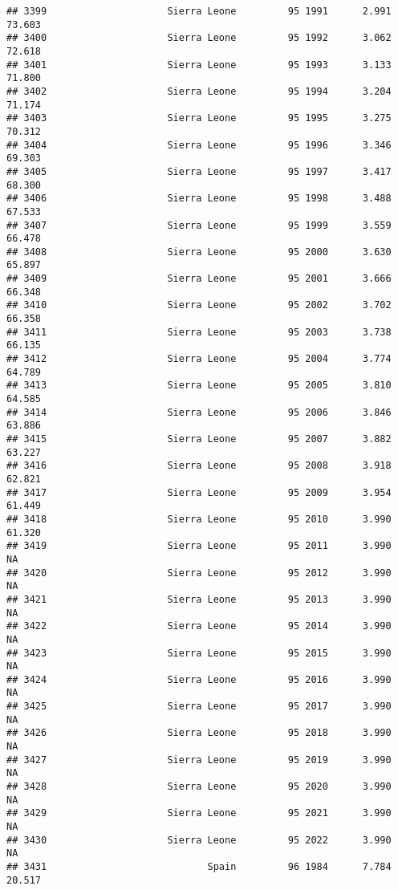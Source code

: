 \documentclass[
]{article}
\begin{document}
\begin{verbatim}
## 3399                     Sierra Leone         95 1991      2.991     73.603
## 3400                     Sierra Leone         95 1992      3.062     72.618
## 3401                     Sierra Leone         95 1993      3.133     71.800
## 3402                     Sierra Leone         95 1994      3.204     71.174
## 3403                     Sierra Leone         95 1995      3.275     70.312
## 3404                     Sierra Leone         95 1996      3.346     69.303
## 3405                     Sierra Leone         95 1997      3.417     68.300
## 3406                     Sierra Leone         95 1998      3.488     67.533
## 3407                     Sierra Leone         95 1999      3.559     66.478
## 3408                     Sierra Leone         95 2000      3.630     65.897
## 3409                     Sierra Leone         95 2001      3.666     66.348
## 3410                     Sierra Leone         95 2002      3.702     66.358
## 3411                     Sierra Leone         95 2003      3.738     66.135
## 3412                     Sierra Leone         95 2004      3.774     64.789
## 3413                     Sierra Leone         95 2005      3.810     64.585
## 3414                     Sierra Leone         95 2006      3.846     63.886
## 3415                     Sierra Leone         95 2007      3.882     63.227
## 3416                     Sierra Leone         95 2008      3.918     62.821
## 3417                     Sierra Leone         95 2009      3.954     61.449
## 3418                     Sierra Leone         95 2010      3.990     61.320
## 3419                     Sierra Leone         95 2011      3.990         NA
## 3420                     Sierra Leone         95 2012      3.990         NA
## 3421                     Sierra Leone         95 2013      3.990         NA
## 3422                     Sierra Leone         95 2014      3.990         NA
## 3423                     Sierra Leone         95 2015      3.990         NA
## 3424                     Sierra Leone         95 2016      3.990         NA
## 3425                     Sierra Leone         95 2017      3.990         NA
## 3426                     Sierra Leone         95 2018      3.990         NA
## 3427                     Sierra Leone         95 2019      3.990         NA
## 3428                     Sierra Leone         95 2020      3.990         NA
## 3429                     Sierra Leone         95 2021      3.990         NA
## 3430                     Sierra Leone         95 2022      3.990         NA
## 3431                            Spain         96 1984      7.784     20.517

\end{verbatim}
\end{document}

